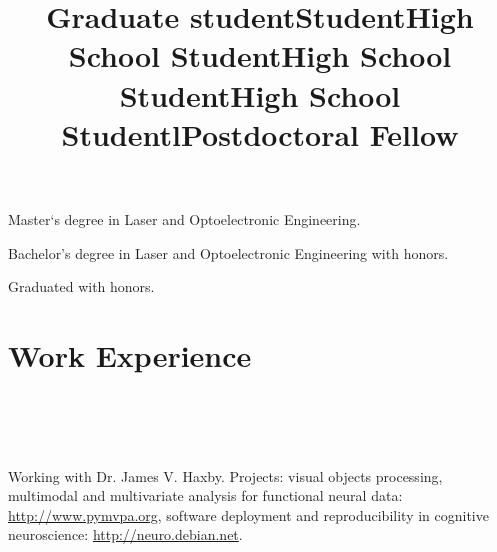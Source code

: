 \documentclass[12pt,overlapped,line]{res}
\begin{document}
\begin{resume}
 \title{Graduate student}
 \begin{position}
  Master`s degree in Laser and Optoelectronic Engineering.
 \end{position}

 \title{Student}
 \begin{position}
  Bachelor's degree in Laser and Optoelectronic Engineering with
  honors.
 \end{position}

 \title{High School Student}
 \begin{position}
  Graduated with honors.
 \end{position}

 \title{High School Student}
 \begin{position}
 \vspace{-2.5em}
 \end{position}

 \title{High School Student}
 \begin{position}
 \end{position}

\vspace{-3em}
 \section{Work Experience}
 \begin{format}
   \title{l}\\
   \\
   \body\\
 \end{format}


\title{Postdoctoral Fellow}
\begin{position}
  Working with Dr. James V. Haxby.  Projects: visual objects
  processing, multimodal and multivariate analysis for functional
  neural data: \url{http://www.pymvpa.org}, software deployment and
  reproducibility in cognitive neuroscience:
  \url{http://neuro.debian.net}.
\end{position}


\end{resume}
\end{document}
